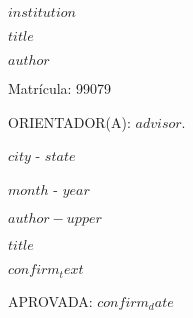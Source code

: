 \thispagestyle{empty}

\begin{center}
$institution$
\end{center}


\vspace{4.0cm}

\begin{center}
    \textbf{$title$}
\end{center}

\vspace{4.0cm}

\begin{center}
$author$

Matrícula: 99079
\end{center}


\vspace{4cm}

\begin{center}

ORIENTADOR(A): $advisor$.
\end{center}

\vspace{4cm}

\begin{center}

$city$ - $state$

$month$ - $year$
    
\end{center}

\newpage
\thispagestyle{empty}

\begin{center}
$author-upper$
\end{center}

\vspace{1.0cm}

\begin{center}
    \textbf{$title$}
\end{center}

\vspace{3.0cm}

\begin{adjustwidth}{7.5cm}{0cm}
    \justifying
    $confirm_text$
\end{adjustwidth}

\vspace{1.0cm}

APROVADA: $confirm_date$

\vspace{1.0cm}

